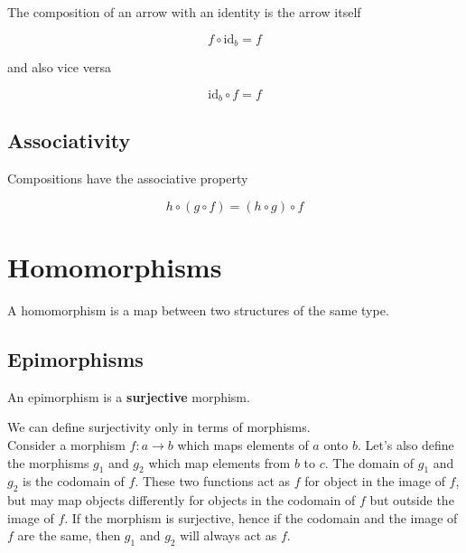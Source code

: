 \documentclass{article}
\begin{document}
The composition of an arrow with an identity is the arrow itself

\begin{center}
\end{center}

\[
    f \circ \text{id}_b = f
\]

and also vice versa

\[
    \text{id}_b \circ f = f
\]

\subsection{Associativity}

Compositions have the associative property

\begin{center}
\end{center}

\[
    h \circ (g \circ f) = (h \circ g) \circ f
\]

\pagebreak

\section{Homomorphisms}

A homomorphism is a map between two structures of the same type.

\subsection{Epimorphisms}

An epimorphism is a \textbf{surjective} morphism.

We can define surjectivity only in terms of morphisms.
\\
Consider a morphism \(f: a \rightarrow b\) which maps elements of \(a\) onto \(b\).
Let's also define the morphisms \(g_1\) and \(g_2\) which map elements from \(b\) to \(c\).
The domain of \(g_1\) and \(g_2\) is the codomain of \(f\). These two functions act
as \(f\) for object in the image of \(f\), but may map objects differently
for objects in the codomain of \(f\) but outside the image of \(f\).
If the morphism is surjective, hence if the codomain and the image of \(f\) are the same,
then \(g_1\) and \(g_2\) will always act as \(f\).
\end{document}
